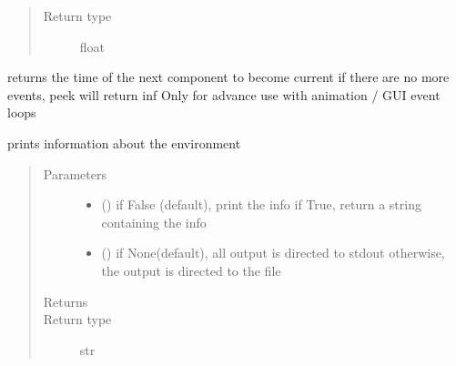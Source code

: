\documentclass[letterpaper,10pt,english]{sphinxmanual}
\begin{document}
\begin{fulllineitems}
\begin{fulllineitems}
\begin{quote}
\begin{description}
\item[{Return type}] \leavevmode
float

\end{description}\end{quote}

\end{fulllineitems}


\begin{fulllineitems}
\label{\detokenize{Reference:salabim.Environment.peek}}
returns the time of the next component to become current 
if there are no more events, peek will return inf 
Only for advance use with animation / GUI event loops

\end{fulllineitems}


\begin{fulllineitems}
\label{\detokenize{Reference:salabim.Environment.print_info}}
prints information about the environment
\begin{quote}\begin{description}
\item[{Parameters}] \leavevmode\begin{itemize}
\item {} 
 () \textendash{} if False (default), print the info
if True, return a string containing the info

\item {} 
 () \textendash{} if None(default), all output is directed to stdout 
otherwise, the output is directed to the file

\end{itemize}

\item[{Returns}] \leavevmode
{}

\item[{Return type}] \leavevmode
str

\end{description}\end{quote}

\end{fulllineitems}


\end{fulllineitems}
\end{document}
